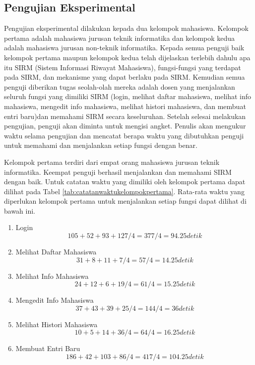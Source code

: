 \subsection{Pengujian Eksperimental}
\label{sec:pengujianeksperimantal}
Pengujian eksperimental dilakukan kepada dua kelompok mahasiswa. Kelompok
pertama adalah mahasiswa jurusan teknik informatika dan kelompok kedua
adalah mahasiswa jurusan non-teknik informatika. Kepada semua penguji baik
kelompok pertama maupun kelompok kedua telah dijelaskan terlebih dahulu apa itu
SIRM (Sistem Informasi Riwayat Mahasiswa), fungsi-fungsi yang terdapat pada SIRM, dan
mekanisme yang dapat berlaku pada SIRM. Kemudian semua penguji diberikan tugas
seolah-olah mereka adalah dosen yang menjalankan seluruh fungsi yang dimiliki
SIRM (login, melihat daftar mahasiswa, melihat info mahasiswa, mengedit info
mahasiswa, melihat histori mahasiswa, dan membuat entri baru)dan memahami SIRM
secara keseluruhan. Setelah selesai melakukan pengujian, penguji akan diminta
untuk mengisi angket. Penulis akan mengukur waktu selama pengujian dan mencatat
berapa waktu yang dibutuhkan penguji untuk memahami dan menjalankan setiap fungsi dengan benar.

Kelompok pertama terdiri dari empat orang mahasiswa jurusan teknik informatika.
Keempat penguji berhasil menjalankan dan memahami SIRM dengan baik. Untuk
catatan waktu yang dimiliki oleh kelompok pertama dapat dilihat pada Tabel
\ref{tab:catatanwaktukelompokpertama}. Rata-rata waktu yang diperlukan
kelompok pertama untuk menjalankan setiap fungsi dapat dilihat di bawah ini.
\begin{enumerate}[1]
  \item Login\\
  $$105 + 52 + 93 + 127 / 4 = 377 / 4 = 94.25 detik$$
  \item Melihat Daftar Mahasiswa
  $$31 + 8 + 11 + 7 / 4 = 57 / 4 = 14.25 detik$$
  \item Melihat Info Mahasiswa
  $$24 + 12 + 6 + 19 / 4 = 61 / 4 = 15.25 detik$$
  \item Mengedit Info Mahasiswa
  $$37 + 43 + 39 + 25 / 4 = 144 / 4 = 36 detik$$
  \item Melihat Histori Mahasiswa
  $$10 + 5 + 14 + 36 / 4 = 64 / 4 = 16.25 detik$$
  \item Membuat Entri Baru
  $$186 + 42 + 103 + 86 / 4 = 417 / 4 = 104.25 detik$$
\end{enumerate}

